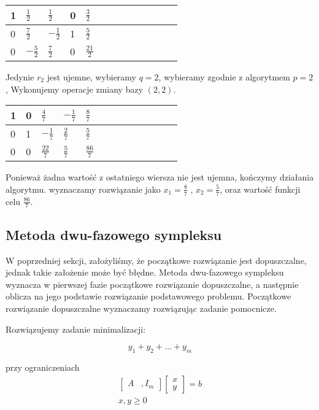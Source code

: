 \documentclass{classrep}
\newcommand{\tnhl}{\tabularnewline\hline}
\begin{document}
\begin{table}[H]
\centering
\begin{tabular}{|x{0.7cm}|x{0.7cm}|x{0.7cm}|x{0.7cm}|x{0.7cm}|}
 & $\frac{1}{2}$ & $\frac{1}{2}$ & 0 & $\frac{3}{2}$ \tnhl
0 & $\frac{7}{2}$ & $-\frac{1}{2}$ & 1 & $\frac{5}{2}$ \tnhl
0 & $-\frac{5}{2}$ & $\frac{7}{2}$ & 0 & $\frac{21}{2}$ \tnhl
\end{tabular} 
\end{table}

Jedynie $r_2$ jest ujemne, wybieramy $q=2$, wybieramy zgodnie z algorytmem $p=2$, Wykonujemy operacje zmiany bazy $(2,2)$.

\begin{table}[H]
\centering
\begin{tabular}{|x{0.7cm}|x{0.7cm}|x{0.7cm}|x{0.7cm}|x{0.7cm}|}
 & 0 & $\frac{4}{7}$ & $-\frac{1}{7}$ & $\frac{8}{7}$ \tnhl 
0 & 1 & $-\frac{1}{7}$ & $\frac{2}{7}$ & $\frac{5}{7}$ \tnhl
0 & 0 & $\frac{22}{7}$ & $\frac{5}{7}$ & $\frac{86}{7}$ \tnhl
\end{tabular} 
\end{table}

Ponieważ żadna wartość z ostatniego wiersza nie jest ujemna, kończymy działania algorytmu. wyznaczamy rozwiązanie jako $x_1 = \frac{8}{7}$ , $x_2=\frac{5}{7}$, oraz wartość funkcji celu $\frac{86}{7}$.

\subsection{Metoda dwu-fazowego sympleksu}

W poprzedniej sekcji, założyliśmy, że początkowe rozwiązanie jest dopuszczalne, jednak takie założenie może być błędne. Metoda dwu-fazowego sympleksu wyznacza w pierwszej fazie początkowe rozwiązanie dopuszczalne, a następnie oblicza na jego podstawie rozwiązanie podstawowego problemu. Początkowe rozwiązanie dopuszczalne wyznaczamy rozwiązując zadanie pomocnicze.

Rozwiązujemy zadanie minimalizacji:

\begin{equation*}
y_1+y_2+\dots+y_m
\end{equation*}

przy ograniczeniach
\begin{align*}
\left[ \begin{smallmatrix} A &, I_m \end{smallmatrix} \right] \left[ \begin{smallmatrix} x\\y \end{smallmatrix} \right] = b\\
x, y \geq 0 \\
\end{align*}
\end{document}
